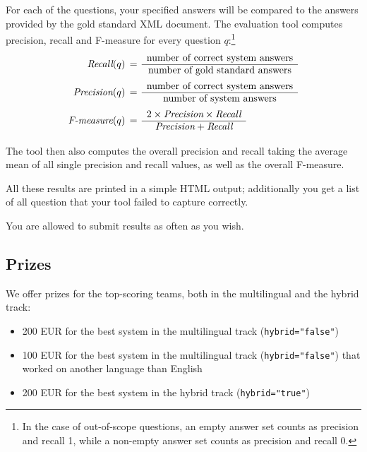 For each of the questions, your specified answers will be compared to the answers provided by the gold standard XML document. 
The evaluation tool computes precision, recall and F-measure for every question $q$:\footnote{In the case of out-of-scope 
questions, an empty answer set counts as precision and recall 1, while a non-empty answer set counts as 
precision and recall 0.}
\begin{align*}
\text{\em Recall}(q) &\, =\, \begin{array}{c} 
                  \text{number of correct system answers} \\
                  \hline 
                  \text{number of gold standard answers} \\ 
                  \end{array} \\
\text{\em Precision}(q) &\, =\, \begin{array}{c} 
                  \text{number of correct system answers} \\
                  \hline 
                  \text{number of system answers} \\ 
                  \end{array} \\
\text{\em F-measure}(q) &\, =\, \begin{array}{c}
                      2\times \text{\em Precision}\times \text{\em Recall} \\
                      \hline 
                      \text{\em Precision} + \text{\em Recall} \\
                      \end{array} \\
\end{align*}

\vspace*{-.7cm}

The tool then also computes the overall precision and recall taking the average mean of
all single precision and recall values, as well as the overall F-measure.

All these results are printed in a simple HTML output; additionally you get a list of 
all question that your tool failed to capture correctly.

You are allowed to submit results as often as you wish.


\subsection{Prizes}

We offer prizes for the top-scoring teams, both in the multilingual and the hybrid track:
\begin{itemize}
\item 200 EUR for the best system in the multilingual track (\texttt{hybrid="false"})
\item 100 EUR for the best system in the multilingual track (\texttt{hybrid="false"}) that worked on another language than English  
\item 200 EUR for the best system in the hybrid track (\texttt{hybrid="true"})
\end{itemize}